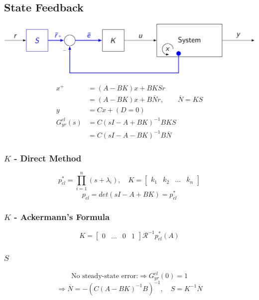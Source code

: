 \subsection{State Feedback}
\centerline{\includegraphics[width=0.95\linewidth]{src/3_state_feedback/images/state_feedback.jpeg}}
\begin{align*}
    x^+ &= (A-BK)x + BKSr\\
    &= (A-BK)x + B\overline{N}r, \qquad \overline{N} = KS\\
    y &= Cx + (D=0)\\[5pt]
    G_{yr}^{cl}(s) &= C(sI - A + BK)^{-1}BKS\\
    &= C(sI - A - BK)^{-1}B\overline{N}
\end{align*}

\subsubsection{$K$ - Direct Method}
$$
    p_{cl}^* = \prod_{i=1}^{n}(s + \lambda_i), \quad K = \begin{bmatrix} k_1 & k_2 & \hdots & k_n \end{bmatrix}
$$
$$
    p_{cl} = det(sI - A + BK) = p_{cl}^*
$$

\subsubsection{$K$ - Ackermann's Formula}
$$
    K = \begin{bmatrix} 0 & \hdots & 0 & 1 \end{bmatrix} \mathcal{R}^{-1}p_{cl}^*(A)
$$
\vspace*{0.1em}

\subsubsection{$S$}
$$
    \text{No steady-state error:} \Rightarrow G_{yr}^{cl}(0) = 1
$$
$$
    \Longrightarrow \overline{N} = - (C(A-BK)^{-1}B)^{-1}, \quad S = K^{-1}\overline{N}
$$
\vspace*{0.1em}